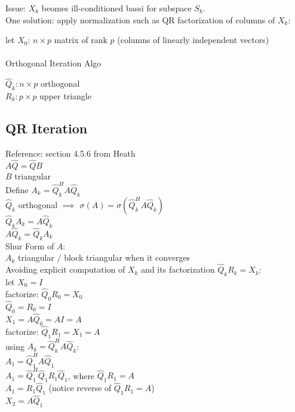\documentclass[8pt,letter]{article}
\begin{document}
\begin{multicols*}{2}
    Issue: $X_k$ beomes ill-conditioned bassi for subspace $S_k$.\\
    One solution: apply normalization such as QR factorization of columns of $X_k$:
    
    \begin{algorithm}[H]
      let $X_0$: $n \times p$ matrix of rank $p$ (columns of linearly independent vectors)\\
      \\
      \caption{Orthogonal Iteration Algo \label{Algo_orthogonal_iteration}}
    \end{algorithm}

    $\hat{Q}_k:  n \times p$ orthogonal\\
    $R_k:  p \times p$ upper triangle\\

    \vfill\null
    \pagebreak
    
    \subsection{QR Iteration}
    Reference: section 4.5.6 from Heath\\
    
    $A\hat{Q} = \hat{Q}B$\\
    $B$ triangular\\

    Define $A_k = \hat{Q}_k^H A \hat{Q}_k$\\
    $\hat{Q}_k$ orthogonal $\implies$ $\sigma(A) = \sigma(\hat{Q}_k^H A \hat{Q}_k)$\\
    $\hat{Q}_k A_k = A \hat{Q}_k$\\
    $A \hat{Q}_k = \hat{Q}_k A_k$\\
    Shur Form of $A$:\\
    $A_k$ triangular / block triangular when it converges\\

    Avoiding explicit computation of $X_k$ and its factorization $\hat{Q}_k R_k = X_k$:\\
    let $X_0 = I$\\
    factorize: $\hat{Q}_0 R_0 = X_0$\\
    $\hat{Q}_0 = R_0 = I$\\
    $X_1 = A \hat{Q}_0 = A I = A$\\
    factorize: $\hat{Q}_1 R_1 = X_1 = A$\\
    using $A_k = \hat{Q}_k^H A \hat{Q}_k$:\\
    $A_1 = \hat{Q}_1^H A \hat{Q}_1$\\
    $A_1 = \hat{Q}_1^H \hat{Q}_1 R_1 \hat{Q}_1$, where $\hat{Q}_1 R_1 = A$\\
    $A_1 = R_1 \hat{Q}_1$ (notice reverse of $\hat{Q}_1 R_1 = A$)\\
    $X_2 = A \hat{Q}_1$\\
   

\end{multicols*}
\end{document}
